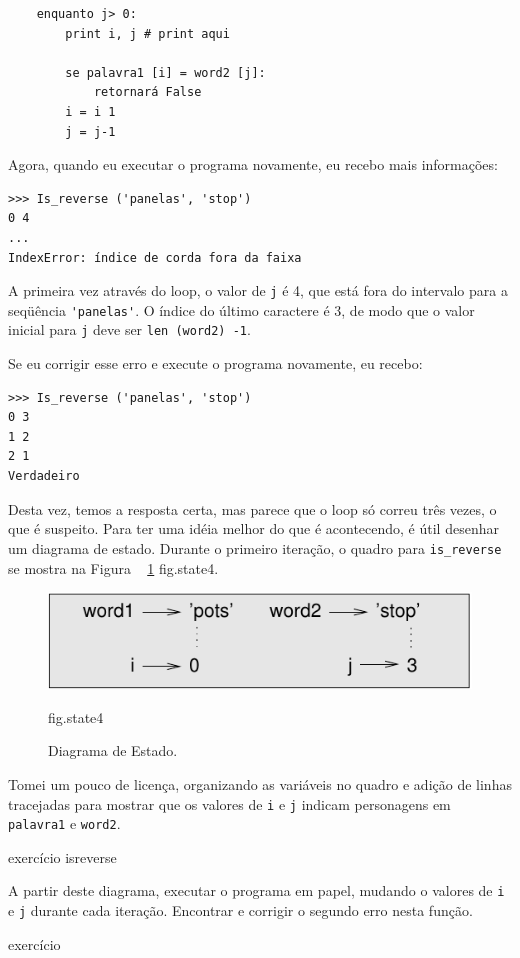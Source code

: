 \documentclass[10pt]{book}
\begin{document}
\begin{verbatim}
    enquanto j> 0:
        print i, j # print aqui
        
        se palavra1 [i] = word2 [j]:
            retornará False
        i = i 1
        j = j-1
\end{verbatim}
%
Agora, quando eu executar o programa novamente, eu recebo mais informações:

\begin{verbatim}
>>> Is_reverse ('panelas', 'stop')
0 4
...
IndexError: índice de corda fora da faixa
\end{verbatim}
%
A primeira vez através do loop, o valor de {\tt j} é 4,
que está fora do intervalo para a seqüência \verb "'panelas'".
O índice do último caractere é 3, de modo que o
valor inicial para {\tt j} deve ser {\tt len ​​(word2) -1}.

Se eu corrigir esse erro e execute o programa novamente, eu recebo:

\begin{verbatim}
>>> Is_reverse ('panelas', 'stop')
0 3
1 2
2 1
Verdadeiro
\end{verbatim}
%
Desta vez, temos a resposta certa, mas parece que o loop só correu
três vezes, o que é suspeito. Para ter uma idéia melhor do que é
acontecendo, é útil desenhar um diagrama de estado. Durante o primeiro
iteração, o quadro para \verb "is_reverse" se mostra na Figura ~ \ref {} fig.state4.

\begin{figure}
\centerline
{\includegraphics[scale = 0.8] {figs/state4.pdf}}
\caption{Diagrama de Estado.}
\label{} fig.state4
\end{figure}


Tomei um pouco de licença, organizando as variáveis ​​no quadro
e adição de linhas tracejadas para mostrar que os valores de {\tt i} e
{\tt j} indicam personagens em {\tt palavra1} e {\tt word2}.

\begin{} exercício
\label{} isreverse

A partir deste diagrama, executar o programa em papel, mudando o
valores de {\tt i} e {\tt j} durante cada iteração. Encontrar e corrigir o
segundo erro nesta função.

\end{} exercício
\end{document}
